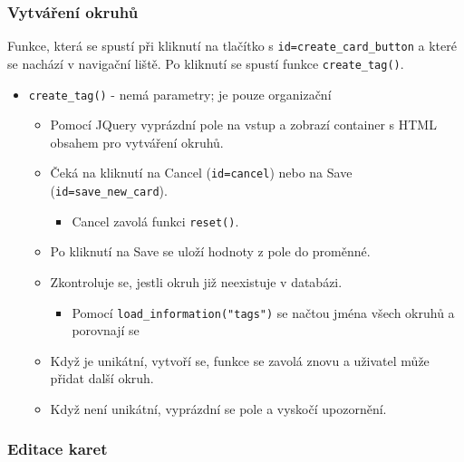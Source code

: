 \documentclass[11pt]{article}
\providecommand{\tightlist}{\setlength{\itemsep}{1pt}\setlength{\parskip}{1pt}}
\let\oldtexttt\texttt
\renewcommand{\texttt}[1]{\oldtexttt{\textcolor{codehighlight}{#1}}}
\begin{document}
\hypertarget{vytvuxe1ux159enuxed-okruhux16f}{%
\subsubsection{Vytváření okruhů}\label{vytvuxe1ux159enuxed-okruhux16f}}

Funkce, která se spustí při kliknutí na tlačítko s
\texttt{id=create\_card\_button} a které se nachází v navigační liště.
Po kliknutí se spustí funkce \texttt{create\_tag()}.

\begin{itemize}
\tightlist
\item
  \texttt{create\_tag()} - nemá parametry; je pouze organizační

  \begin{itemize}
  \tightlist
  \item
    Pomocí JQuery vyprázdní pole na vstup a zobrazí container s HTML
    obsahem pro vytváření okruhů.
  \item
    Čeká na kliknutí na Cancel (\texttt{id=cancel}) nebo na Save
    (\texttt{id=save\_new\_card}).

    \begin{itemize}
    \tightlist
    \item
      Cancel zavolá funkci \texttt{reset()}.
    \end{itemize}
  \item
    Po kliknutí na Save se uloží hodnoty z pole do proměnné.
  \item
    Zkontroluje se, jestli okruh již neexistuje v databázi.

    \begin{itemize}
    \tightlist
    \item
      Pomocí \texttt{load\_information("tags")} se načtou jména všech
      okruhů a porovnají se
    \end{itemize}
  \item
    Když je unikátní, vytvoří se, funkce se zavolá znovu a uživatel může
    přidat další okruh.
  \item
    Když není unikátní, vyprázdní se pole a vyskočí upozornění.
  \end{itemize}
\end{itemize}

\hypertarget{editace-karet}{%
\subsubsection{Editace karet}\label{editace-karet}}
\end{document}
